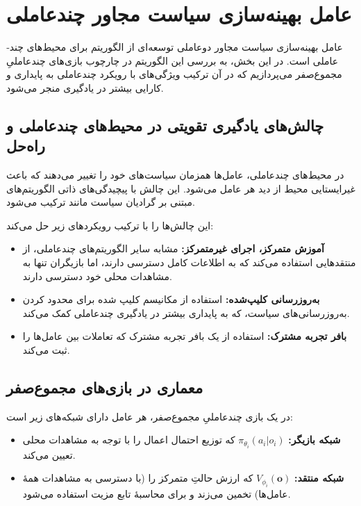 \section{عامل بهینه‌سازی سیاست مجاور چند‌عاملی}\label{sec:MAPPO}

عامل بهینه‌سازی سیاست مجاور دو­عاملی
توسعه‌ای از الگوریتم  برای محیط‌های چند­عاملی است. در این بخش، به بررسی این الگوریتم در چارچوب بازی‌های چندعاملیِ مجموع­‌صفر می‌پردازیم که در آن ترکیب ویژگی‌های  با رویکرد چند­عاملی به پایداری و کارایی بیشتر در یادگیری منجر می‌شود.

\subsection{چالش‌های یادگیری تقویتی در محیط‌های چند­عاملی و راه‌حل }

در محیط‌های چند­عاملی، عامل‌ها همزمان سیاست‌های خود را تغییر می‌دهند که باعث غیرایستایی محیط از دید هر عامل می‌شود. این چالش با پیچیدگی‌های ذاتی الگوریتم‌های مبتنی بر گرادیان سیاست مانند  ترکیب می‌شود.

 این چالش‌ها را با ترکیب رویکردهای زیر حل می‌کند:
\begin{itemize}
    \item \textbf{آموزش متمرکز، اجرای غیرمتمرکز:} مشابه سایر الگوریتم‌های چندعاملی، از منتقدهایی استفاده می‌کند که به اطلاعات کامل دسترسی دارند، اما بازیگران تنها به مشاهدات محلی خود دسترسی دارند.
    \item \textbf{به‌روزرسانی کلیپ‌شده:} استفاده از مکانیسم کلیپ شده  برای محدود کردن به‌روزرسانی‌های سیاست، که به پایداری بیشتر در یادگیری چند‌عاملی کمک می‌کند.
    \item \textbf{بافر تجربه مشترک:} استفاده از یک بافر تجربه مشترک که تعاملات بین عامل‌ها را ثبت می‌کند.
\end{itemize}

\subsection{معماری  در بازی‌های مجموع­‌صفر}

در یک بازی چندعاملیِ مجموع­‌صفر، هر عامل دارای شبکه‌های زیر است:

\begin{itemize}
    \item \textbf{شبکه بازیگر:} $\pi_{\theta_i}(a_i|o_i)$ که توزیع احتمال اعمال را با توجه به مشاهدات محلی تعیین می‌کند.
    \item \textbf{شبکه منتقد:} $V_{\phi_i}(\boldsymbol{o})$ که ارزش حالتِ متمرکز را (با دسترسی به مشاهدات همهٔ عامل‌ها) تخمین می‌زند و برای محاسبهٔ تابع مزیت استفاده می‌شود.
\end{itemize}

